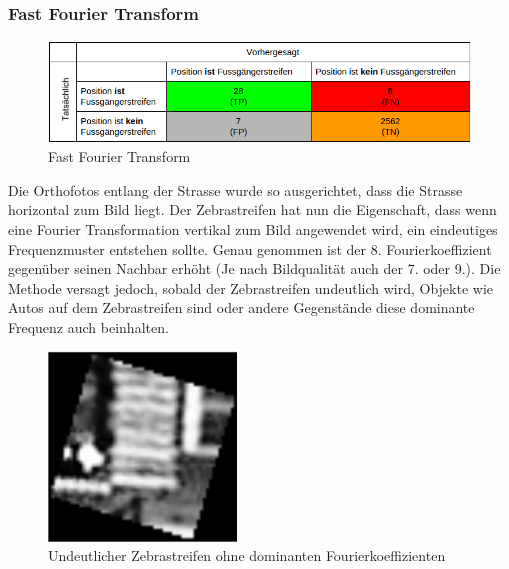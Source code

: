 \subsubsection{Fast Fourier Transform}	
\begin{figure}[H]
\includegraphics[width=\textwidth]{images/fast_fourier_conf.png}
\caption[Fast Fourier Transform]{Fast Fourier Transform}
\end{figure}
Die Orthofotos entlang der Strasse wurde so ausgerichtet, dass die Strasse horizontal zum Bild liegt. Der Zebrastreifen hat nun die Eigenschaft, dass wenn eine Fourier Transformation vertikal zum Bild angewendet wird, ein eindeutiges Frequenzmuster entstehen sollte. Genau genommen ist der 8. Fourierkoeffizient gegenüber seinen Nachbar erhöht (Je nach Bildqualität auch der 7. oder 9.).
Die Methode versagt jedoch, sobald der Zebrastreifen undeutlich wird, Objekte wie Autos auf dem Zebrastreifen sind oder andere Gegenstände diese dominante Frequenz auch beinhalten.\\
\begin{figure}[H]
	\centering
	\includegraphics[width=5cm]{images/Unsharp_Crosswalk2.png}\caption[Scale-invariant Feature Transform]{Undeutlicher Zebrastreifen ohne dominanten Fourierkoeffizienten}
\end{figure}
\newpage
